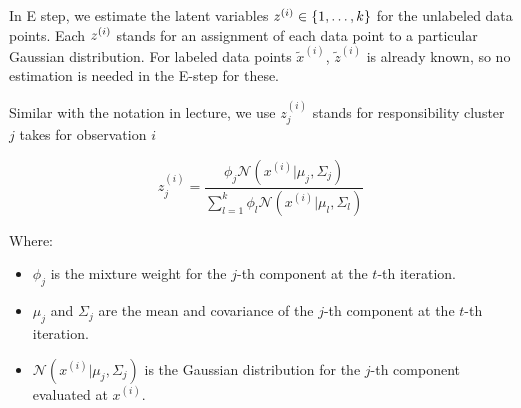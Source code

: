 \begin{answer}

 In E step, we estimate the latent variables $z^{(i)} \in \{1,\ldots,k\}$ for the unlabeled data points. Each $z^{(i)}$ stands for an assignment of each data point to a particular Gaussian distribution. For labeled data points \(\tilde{x}^{(i)}\), \( \tilde{z}^{(i)} \) is already known, so no estimation is needed in the E-step for these.

Similar with the notation in lecture, we use $z^{(i)}_{j}$ stands for responsibility cluster $j$ takes for observation $i$

\begin{equation}
  z^{(i)}_{j}= \frac{\phi_j \mathcal{N}(x^{(i)} | \mu_j, \Sigma_j)}{\sum_{l=1}^k \phi_l \mathcal{N}(x^{(i)} | \mu_l, \Sigma_l)} 
\end{equation}

Where:

\begin{itemize}
    \item \(\phi_j\) is the mixture weight for the \(j\)-th component at the \(t\)-th iteration.
    \item \(\mu_j\) and \(\Sigma_j\) are the mean and covariance of the \(j\)-th component at the \(t\)-th iteration.
    \item \(\mathcal{N}(x^{(i)} | \mu_j, \Sigma_j)\) is the Gaussian distribution for the \(j\)-th component evaluated at \(x^{(i)}\).
\end{itemize}








\end{answer}
